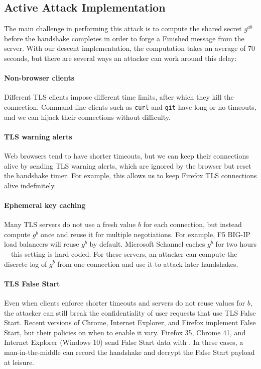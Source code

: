 
\subsection{Active Attack Implementation}
The main challenge in performing this attack is to compute the shared secret
$g^{ab}$ before the handshake completes in order to forge a \textsf{Finished}
message from the server. With our descent implementation, the computation
takes an average of 70 seconds, but there are several ways an attacker can
work around this delay:

\paragraph{Non-browser clients}
Different TLS clients impose different time limits, after which they kill the
connection. Command-line clients such as \texttt{curl} and \texttt{git} have
long or no timeouts, and we can hijack their connections without difficulty.

\paragraph{TLS warning alerts}
Web browsers tend to have shorter timeouts, but we can keep their connections
alive by sending TLS warning alerts, which are ignored by the browser but
reset the handshake timer. For example, this allows us to keep Firefox TLS
connections alive indefinitely.

\paragraph{Ephemeral key caching}
Many TLS servers do not use a fresh value $b$ for each connection, but
instead compute $g^b$ once and reuse it for multiple negotiations. For
example, F5 BIG-IP load balancers will reuse $g^b$ by default. Microsoft
Schannel caches $g^b$ for two hours---this setting is hard-coded. For these
servers, an attacker can compute the discrete log of $g^b$ from one
connection and use it to attack later handshakes.

\paragraph{TLS False Start}
Even when clients enforce shorter timeouts and servers do not reuse values
for $b$, the attacker can still break the confidentiality of user requests
that use TLS False Start. Recent versions of Chrome, Internet Explorer, and
Firefox implement False Start, but their policies on when to enable it vary.
Firefox 35, Chrome 41, and Internet Explorer (Windows 10) send False Start
data with \dhe{}\@. In these cases, a man-in-the-middle can record the
handshake and decrypt the False Start payload at leisure.

